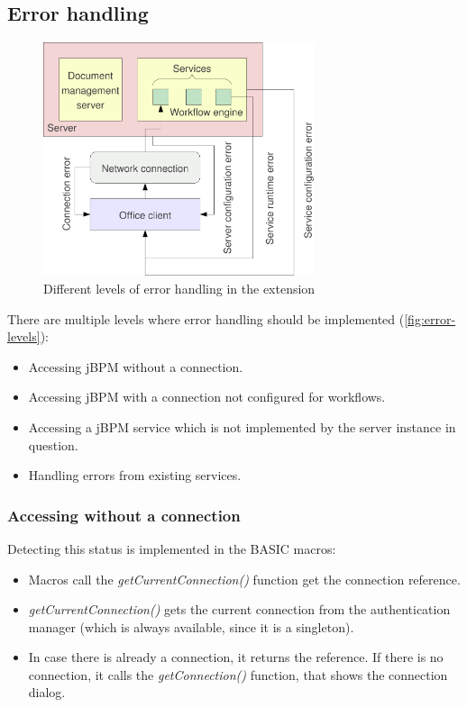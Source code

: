 \subsection{Error handling}

\begin{figure}[H]
\centering
\includegraphics[width=300px,keepaspectratio]{error-levels.pdf}
\caption{Different levels of error handling in the extension}
\label{fig:error-levels}
\end{figure}

There are multiple levels where error handling should be implemented
(\autoref{fig:error-levels}):

\begin{itemize}
\item Accessing jBPM without a connection.
\item Accessing jBPM with a connection not configured for workflows.
\item Accessing a jBPM service which is not implemented by the server instance in question.
\item Handling errors from existing services.
\end{itemize}

\subsubsection*{Accessing without a connection}

Detecting this status is implemented in the BASIC macros:

\begin{itemize}
\item Macros call the \emph{getCurrentConnection()} function get the connection reference.
\item \emph{getCurrentConnection()} gets the current connection from the authentication manager (which is always available, since it is a singleton).
\item In case there is already a connection, it returns the reference. If there is no connection, it calls the \emph{getConnection()} function, that shows the connection dialog.
\end{itemize}

